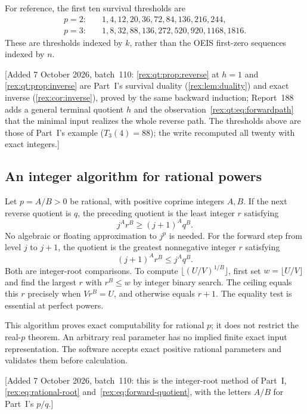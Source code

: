 For reference, the first ten survival thresholds are
\begin{align*}
 p=2:&\quad 1,4,12,20,36,72,84,136,216,244,\\
 p=3:&\quad 1,8,32,88,136,272,520,920,1168,1816.
\end{align*}
These are thresholds indexed by $k$, rather than the OEIS first-zero sequences indexed by $n$.

[Added 7 October 2026, batch~110: \cref{rex:qt:prop:reverse} at $h=1$
and \cref{rex:qt:prop:inverse} are Part~I's survival duality
(\cref{rex:lem:duality}) and exact inverse (\cref{rex:cor:inverse}),
proved by the same backward induction; Report~188 adds a general terminal
quotient $h$ and the observation~\eqref{rex:qt:eq:forwardpath} that the
minimal input realizes the whole reverse path. The thresholds above are
those of Part~I's example ($T_3(4)=88$); the write recomputed all twenty
with exact integers.]

\subsection{An integer algorithm for rational powers}\label{rex:qt:sec:algorithm}
Let $p=A/B>0$ be rational, with positive coprime integers $A,B$. If the next reverse quotient is $q$, the preceding quotient is the least integer $r$ satisfying
\begin{equation}\label{rex:qt:eq:exactceiling}
 j^A r^B\ge (j+1)^A q^B.
\end{equation}
No algebraic or floating approximation to $j^p$ is needed. For the forward step from level $j$ to $j+1$, the quotient is the greatest nonnegative integer $r$ satisfying
\begin{equation}\label{rex:qt:eq:exactfloor}
 (j+1)^A r^B\le j^A q^B.
\end{equation}
Both are integer-root comparisons. To compute $\lfloor(U/V)^{1/B}\rfloor$, first set $w=\lfloor U/V\rfloor$ and find the largest $r$ with $r^B\le w$ by integer binary search. The ceiling equals this $r$ precisely when $V r^B=U$, and otherwise equals $r+1$. The equality test is essential at perfect powers.

This algorithm proves exact computability for rational $p$; it does not restrict the real-$p$ theorem. An arbitrary real parameter has no implied finite exact input representation. The software accepts exact positive rational parameters and validates them before calculation.

[Added 7 October 2026, batch~110: this is the integer-root method of
Part~I, \eqref{rex:eq:rational-root} and~\eqref{rex:eq:forward-quotient},
with the letters $A/B$ for Part~I's $p/q$.]

